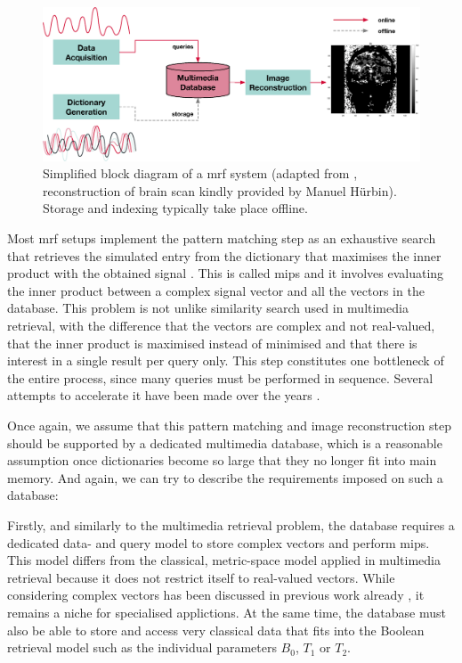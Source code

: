 \begin{figure}[tb]
    \centering
    \includegraphics[width=\textwidth]{figures/mrf.eps}
    \caption{Simplified block diagram of a \acrshort{mrf} system (adapted from \cite{Bipin:2019Magnetic}, reconstruction of brain scan kindly provided by Manuel Hürbin). Storage and indexing typically take place offline.}
    \label{figure:mrf}
\end{figure}

Most \acrshort{mrf} setups implement the pattern matching step as an exhaustive search that retrieves the simulated entry from the dictionary that maximises the inner product with the obtained signal \cite{Bipin:2019Magnetic}. This is called \acrfull{mips} and it involves evaluating the inner product between a complex signal vector and all the vectors in the database. This problem is not unlike similarity search used in multimedia retrieval, with the difference that the vectors are complex and not real-valued, that the inner product is maximised instead of minimised and that there is interest in a single result per query only. This step constitutes one bottleneck of the entire process, since many queries must be performed in sequence. Several attempts to accelerate it have been made over the years \cite{Mcgivney:2014SVD,Cauley:2015Fast,Cohen:2018MR}.

Once again, we assume that this pattern matching and image reconstruction step should be supported by a dedicated multimedia database, which is a reasonable assumption once dictionaries become so large that they no longer fit into main memory. And again, we can try to describe the requirements imposed on such a database: 

Firstly, and similarly to the multimedia retrieval problem, the database requires a dedicated data- and query model to store complex vectors and perform \acrshort{mips}. This model differs from the classical, metric-space model applied in multimedia retrieval because it does not restrict itself to real-valued vectors. While considering complex vectors has been discussed in previous work already \cite{Rafiei:1997Similarity}, it remains a niche for specialised applictions. At the same time, the database must also be able to store and access very classical data that fits into the Boolean retrieval model such as the individual parameters $B_0$, $T_1$ or $T_2$. 

